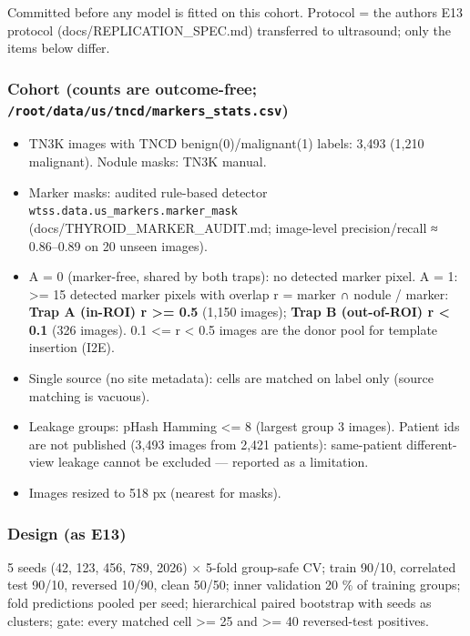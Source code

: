 {\small
Committed before any model is fitted on this cohort. Protocol = the author\textquotesingle s E13 protocol
(docs/REPLICATION\_SPEC.md) transferred to ultrasound; only the items below differ.

\subsubsection{\texorpdfstring{Cohort (counts are outcome-free; \texttt{/root/data/us/tncd/markers\_stats.csv})}{Cohort (counts are outcome-free; /root/data/us/tncd/markers\_stats.csv)}}\label{cohort-counts-are-outcome-free-rootdataustncdmarkers_statscsv}

\begin{itemize}

\item
  TN3K images with TNCD benign(0)/malignant(1) labels: 3,493 (1,210 malignant). Nodule masks: TN3K manual.
\item
  Marker masks: audited rule-based detector \texttt{wtss.data.us\_markers.marker\_mask} (docs/THYROID\_MARKER\_AUDIT.md;
  image-level precision/recall ≈ 0.86--0.89 on 20 unseen images).
\item
  A = 0 (marker-free, shared by both traps): no detected marker pixel. A = 1: \textgreater= 15 detected marker pixels with
  overlap r = \textbar marker ∩ nodule\textbar{} / \textbar marker\textbar: \textbf{Trap A (in-ROI) r \textgreater= 0.5} (1,150 images); \textbf{Trap B (out-of-ROI)
  r \textless{} 0.1} (326 images). 0.1 \textless= r \textless{} 0.5 images are the donor pool for template insertion (I2E).
\item
  Single source (no site metadata): cells are matched on label only (source matching is vacuous).
\item
  Leakage groups: pHash Hamming \textless= 8 (largest group 3 images). Patient ids are not published (3,493 images from
  2,421 patients): same-patient different-view leakage cannot be excluded --- reported as a limitation.
\item
  Images resized to 518 px (nearest for masks).
\end{itemize}

\subsubsection{Design (as E13)}\label{design-as-e13}

5 seeds (42, 123, 456, 789, 2026) × 5-fold group-safe CV; train 90/10, correlated test 90/10, reversed 10/90,
clean 50/50; inner validation 20 \% of training groups; fold predictions pooled per seed; hierarchical paired
bootstrap with seeds as clusters; gate: every matched cell \textgreater= 25 and \textgreater= 40 reversed-test positives.

}
